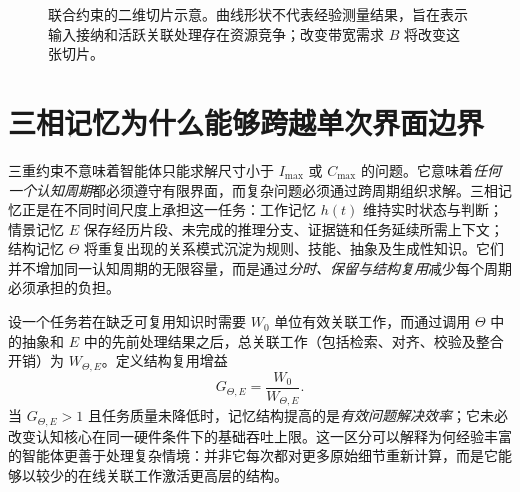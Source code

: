 \begin{figure}[htbp]
\centering
{}
\caption{联合约束的二维切片示意。曲线形状不代表经验测量结果，旨在表示输入接纳和活跃关联处理存在资源竞争；改变带宽需求 $B$ 将改变这张切片。}
\label{fig:feasible_slice}
\end{figure}

\section{三相记忆为什么能够跨越单次界面边界}
\label{sec:memory_multiscale}

三重约束不意味着智能体只能求解尺寸小于 $I_{\max}$ 或 $C_{\max}$ 的问题。它意味着\emph{任何一个认知周期}都必须遵守有限界面，而复杂问题必须通过跨周期组织求解。三相记忆正是在不同时间尺度上承担这一任务：工作记忆 $h(t)$ 维持实时状态与判断；情景记忆 $E$ 保存经历片段、未完成的推理分支、证据链和任务延续所需上下文；结构记忆 $\Theta$ 将重复出现的关系模式沉淀为规则、技能、抽象及生成性知识。它们并不增加同一认知周期的无限容量，而是通过\emph{分时、保留与结构复用}减少每个周期必须承担的负担。

设一个任务若在缺乏可复用知识时需要 $W_0$ 单位有效关联工作，而通过调用 $\Theta$ 中的抽象和 $E$ 中的先前处理结果之后，总关联工作（包括检索、对齐、校验及整合开销）为 $W_{\Theta,E}$。定义结构复用增益
\begin{equation}
 G_{\Theta,E}=\frac{W_0}{W_{\Theta,E}}.
 \label{eq:reuse_gain}
\end{equation}
当 $G_{\Theta,E}>1$ 且任务质量未降低时，记忆结构提高的是\emph{有效问题解决效率}；它未必改变认知核心在同一硬件条件下的基础吞吐上限。这一区分可以解释为何经验丰富的智能体更善于处理复杂情境：并非它每次都对更多原始细节重新计算，而是它能够以较少的在线关联工作激活更高层的结构。

